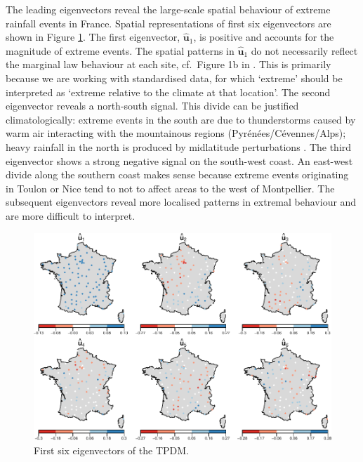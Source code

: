 \documentclass[en-GB, a4paper, nobind]{templates/bathreport}
\begin{document}
The leading eigenvectors reveal the large-scale spatial behaviour of extreme rainfall events in France. Spatial representations of first six eigenvectors are shown in Figure \ref{fig:fr-tpdm-evecs}. The first eigenvector, \(\hat{\bm{u}}_1\), is positive and accounts for the magnitude of extreme events. The spatial patterns in \(\hat{\bm{u}}_1\) do not necessarily reflect the marginal law behaviour at each site, cf.~Figure 1b in \textcite{bernardClusteringMaximaSpatial2013}. This is primarily because we are working with standardised data, for which `extreme' should be interpreted as `extreme relative to the climate at that location'. The second eigenvector reveals a north-south signal. This divide can be justified climatologically: extreme events in the south are due to thunderstorms caused by warm air interacting with the mountainous regions (Pyrénées/Cévennes/Alps); heavy rainfall in the north is produced by midlatitude perturbations \autocite{bernardClusteringMaximaSpatial2013}. The third eigenvector shows a strong negative signal on the south-west coast. An east-west divide along the southern coast makes sense because extreme events originating in Toulon or Nice tend to not to affect areas to the west of Montpellier. The subsequent eigenvectors reveal more localised patterns in extremal behaviour and are more difficult to interpret.

\begin{figure}

{\centering \includegraphics[width=1\linewidth]{figures/fr-tpdm-evecs-1} 

}

\caption[First six eigenvectors of the TPDM.]{First six eigenvectors of the TPDM.}\label{fig:fr-tpdm-evecs}
\end{figure}
\end{document}
